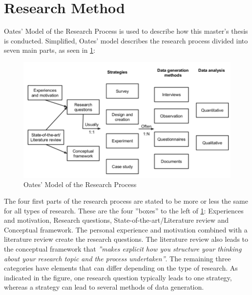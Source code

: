     

\section{Research Method}
    Oates'\cite{research} Model of the Research Process is used to describe how this master's thesis is conducted. Simplified, Oates' model describes the research process divided into seven main parts, as seen in \cref{fig:oates}:
    
    \FloatBarrier
    \begin{figure}
        \centering
        \includegraphics[width=\ImageWidth]{figures/oates.png}
        \caption{Oates' Model of the Research Process}
        \label{fig:oates}
    \end{figure}
    \FloatBarrier
    
    
    The four first parts of the research process are stated to be more or less the same for all types of research. These are the four ''boxes'' to the left of \cref{fig:oates}: Experiences and motivation, Research questions, State-of-the-art/Literature review and Conceptual framework. The personal experience and motivation combined with a literature review create the research questions. The literature review also leads to the conceptual framework that \emph{''makes explicit how you structure your thinking about your research topic and the process undertaken''}. The remaining three categories have elements that can differ depending on the type of research. As indicated in the figure, one research question typically leads to one strategy, whereas a strategy can lead to several methods of data generation.
    
